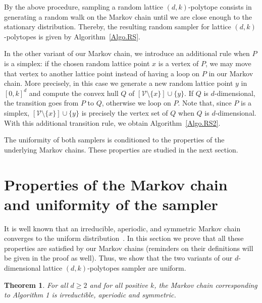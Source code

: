 \documentclass[a4paper,10pt]{article}
\newtheorem{theorem}{Theorem}
\begin{document}
By the above procedure, sampling a random lattice $(d,k)$-polytope consists in generating a random walk on the Markov chain until we are close enough to the stationary distribution. Thereby, the resulting random sampler for lattice $(d,k)$-polytopes is given by Algorithm~\ref{Algo.RS}.

\vspace{4ex}

\vspace{4ex}

In the other variant of our Markov chain, we introduce an additional rule when $P$ is a simplex: if the chosen random lattice point $x$ is a vertex of $P$, we may move that vertex to another lattice point instead of having a loop on $P$ in our Markov chain. More precisely, in this case we generate a new random lattice point $y$ in $[0,k]^d$ and compute the convex hull $Q$ of $[\mathcal{V}\mathord{\setminus}\{x\}]\cup\{y\}$. If $Q$ is $d$-dimensional, the transition goes from $P$ to $Q$, otherwise we loop on $P$. Note that, since $P$ is a simplex, $[\mathcal{V}\mathord{\setminus}\{x\}]\cup\{y\}$ is precisely the vertex set of $Q$ when $Q$ is $d$-dimensional. With this additional transition rule, we obtain Algorithm~\ref{Algo.RS2}.

\vspace{4ex}

\vspace{4ex}

The uniformity of both samplers is conditioned to the properties of the underlying Markov chains. These properties are studied in the next section.

\section{Properties of the Markov chain and uniformity of the sampler}\label{Sec.Pr}

It is well known that an irreducible, aperiodic, and symmetric Markov chain converges to the uniform distribution~\cite{levin2009markov}. In this section we prove that all these properties are satisfied by our Markov chains (reminders on their definitions will be given in the proof as well). Thus, we show that the two variants of our $d$-dimensional lattice $(d,k)$-polytopes sampler are uniform.

\begin{theorem}\label{Thm.MC}
  For all $d\geq2$ and for all positive $k$, the Markov chain corresponding to Algorithm 1 is irreductible, aperiodic and symmetric.
\end{theorem}
\end{document}
